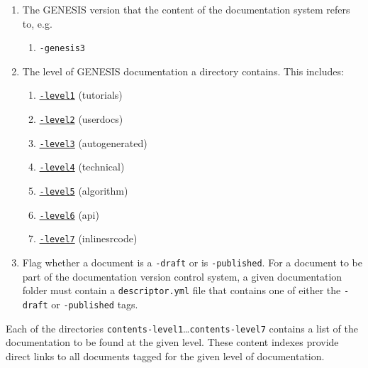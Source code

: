 \documentclass[12pt]{article}
\begin{document}
\begin{enumerate}

\item The GENESIS version that the content of the documentation system refers to, e.g.
\begin{enumerate}
\item  {\tt -genesis3}
\end{enumerate}

\item The level of GENESIS documentation a directory contains. This includes:

	\begin{enumerate}

	\item \href{../contents-level1/contents-level1.pdf}{{\tt -level1}} (tutorials)

	\item \href{../contents-level2/contents-level2.pdf}{{\tt -level2}} (userdocs)

	\item \href{../contents-level3/contents-level3.pdf}{{\tt -level3}} (autogenerated)

	\item \href{../contents-level4/contents-level4.pdf}{{\tt -level4}} (technical)

	\item \href{../contents-level5/contents-level5.pdf}{{\tt -level5}} (algorithm)

	\item \href{../contents-level6/contents-level6.pdf}{{\tt -level6}} (api)

	\item \href{../contents-level7/contents-level7.pdf}{{\tt -level7}} (inlinesrcode)

	\end{enumerate}

\item Flag whether a document is a {\tt -draft} or is {\tt -published}. For a document to be part of the documentation version control system, a given documentation folder must contain a {\tt descriptor.yml} file that contains one of either the {\tt -draft} or {\tt -published} tags.

\end{enumerate}

Each of the directories {\tt contents-level1}\ldots {\tt contents-level7} contains a list of the documentation to be found at the given level. These content indexes provide direct links to all documents tagged for the given level of documentation.
\end{document}
